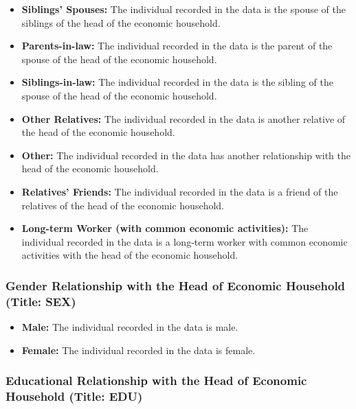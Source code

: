\documentclass[twocolumn]{article}
\begin{document}
\begin{itemize}
    \item \textbf{Siblings' Spouses:} The individual recorded in the data is the spouse of the siblings of the head of the economic household.
    \item \textbf{Parents-in-law:} The individual recorded in the data is the parent of the spouse of the head of the economic household.
    \item \textbf{Siblings-in-law:} The individual recorded in the data is the sibling of the spouse of the head of the economic household.
    \item \textbf{Other Relatives:} The individual recorded in the data is another relative of the head of the economic household.
    \item \textbf{Other:} The individual recorded in the data has another relationship with the head of the economic household.
    \item \textbf{Relatives' Friends:} The individual recorded in the data is a friend of the relatives of the head of the economic household.
    \item \textbf{Long-term Worker (with common economic activities):} The individual recorded in the data is a long-term worker with common economic activities with the head of the economic household.
\end{itemize}
	\subsubsection{Gender Relationship with the Head of Economic Household (Title: SEX)}

\begin{itemize}
    \item \textbf{Male:} The individual recorded in the data is male.
    \item \textbf{Female:} The individual recorded in the data is female.
\end{itemize}

	\subsubsection{Educational Relationship with the Head of Economic Household (Title: EDU)}
\end{document}
